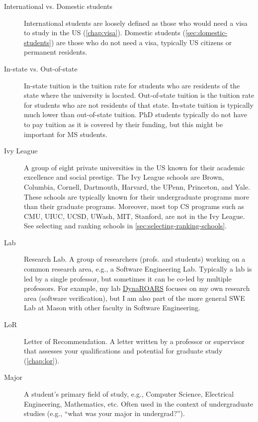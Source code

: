 \documentclass[oneside,11pt,dvipsnames]{book}
\begin{document}
\begin{description}
    
  \item[International vs. Domestic students] International students are loosely defined as those who would need a visa to study in the US (\autoref{chap:visa}). Domestic students (\autoref{sec:domestic-students}) are those who do not need a visa, typically US citizens or permanent residents.   
  

  \item [In-state vs. Out-of-state] In-state tuition is the tuition rate for students who are residents of the state where the university is located. Out-of-state tuition is the tuition rate for students who are not residents of that state. In-state tuition is typically much lower than out-of-state tuition. PhD students typically do not have to pay tuition as it is covered by their funding, but this might be important for MS students.
  
  \item [Ivy League] A group of eight private universities in the US known for their academic excellence and social prestige. The Ivy League schools are Brown, Columbia, Cornell, Dartmouth, Harvard, the UPenn, Princeton, and Yale. These schools are typically known for their undergraduate programs more than their graduate programs. Moreover, most top CS programs such as CMU, UIUC, UCSD, UWash, MIT, Stanford, are not in the Ivy League. See selecting and ranking schools in \autoref{sec:selecting-ranking-schools}.

  \item [Lab] Research Lab. A group of researchers (profs. and students) working on a common research area, e.g., a Software Engineering Lab.  Typically a lab is led by a single professor, but sometimes it can be co-led by multiple professors. For example, my lab \href{https://dynaroars.cs.gmu.edu}{DynaROARS} focuses on my own research area (software verification), but I am also part of the more general SWE Lab at Mason with other faculty in Software Engineering.

  \item[LoR] Letter of Recommendation. A letter written by a professor or supervisor that assesses your qualifications and potential for graduate study (\autoref{chap:lor}).

  \item[Major] A student's primary field of study, e.g., Computer Science, Electrical Engineering, Mathematics, etc. Often used in the context of undergraduate studies (e.g., ``what was your major in undergrad?'').


\end{description}
\end{document}
